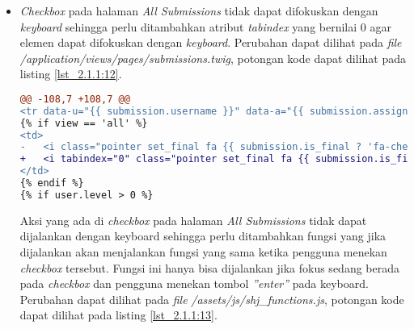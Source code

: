 \begin{itemize}
\begin{lstlisting}[language=diff, caption=Perubahan pada \textit{file} \textit{add\_assignment.twig}, label=lst_2.1.1:11, basicstyle=\ttfamily, frame=single,
columns=fullflexible, keepspaces=true, breaklines=true]
@@ -34,6 +34,16 @@
<td><input type="checkbox" name="is_upload_only[]" class="check" value="PID"/><td><i class="fa fa-times-circle fa-lg color1 delete_problem pointer"></i></td></td>\
</tr>';
$(document).ready(function(){
+ 	$("#add").on('keyup', function (e) {
+ 		if(e.which==13){
+ 			$(this).trigger("click");
+ 		}
+ 	})
+ 	$(".delete_problem").on('keyup', function (e) {
+ 		if(e.which==13){
+ 			$(this).trigger("click");
+ 		}
+ 	})
$("#add").click(function(){
$('#problems_table>tbody').append(shj.row.replace(/PID/g, (shj.num_of_problems+1)));
shj.num_of_problems++;
\end{lstlisting}

	\item \textit{Checkbox} pada halaman \textit{All Submissions} tidak dapat difokuskan dengan \textit{keyboard} sehingga perlu ditambahkan atribut \textit{tabindex} yang bernilai 0 agar elemen dapat difokuskan dengan \textit{keyboard}. Perubahan dapat dilihat pada \textit{file} \textit{/application/views/pages/submissions.twig}, potongan kode dapat dilihat pada listing \ref{lst_2.1.1:12}.
	
\begin{lstlisting}[language=diff, caption=Perubahan pada \textit{file} \textit{submissions.twig}, label=lst_2.1.1:12, basicstyle=\ttfamily, frame=single,
columns=fullflexible, keepspaces=true, breaklines=true]
@@ -108,7 +108,7 @@
<tr data-u="{{ submission.username }}" data-a="{{ submission.assignment }}" data-p="{{ submission.problem }}" data-s="{{ submission.submit_id }}" {% if view == 'final' and j is even %}class="hl"{% endif %}>
{% if view == 'all' %}
<td>
- 	<i class="pointer set_final fa {{ submission.is_final ? 'fa-check-circle-o color11' : 'fa-circle-o' }} fa-2x"></i>
+ 	<i tabindex="0" class="pointer set_final fa {{ submission.is_final ? 'fa-check-circle-o color11' : 'fa-circle-o' }} fa-2x"></i>
</td>
{% endif %}
{% if user.level > 0 %}
\end{lstlisting}
	
	Aksi yang ada di \textit{checkbox} pada halaman \textit{All Submissions} tidak dapat dijalankan dengan keyboard sehingga perlu ditambahkan fungsi yang jika dijalankan akan menjalankan fungsi yang sama ketika pengguna menekan \textit{checkbox} tersebut. Fungsi ini hanya bisa dijalankan jika fokus sedang berada pada \textit{checkbox} dan pengguna menekan tombol \textit{''enter''} pada keyboard. Perubahan dapat dilihat pada \textit{file} \textit{/assets/js/shj\_functions.js}, potongan kode dapat dilihat pada listing \ref{lst_2.1.1:13}.
	

\end{itemize}
